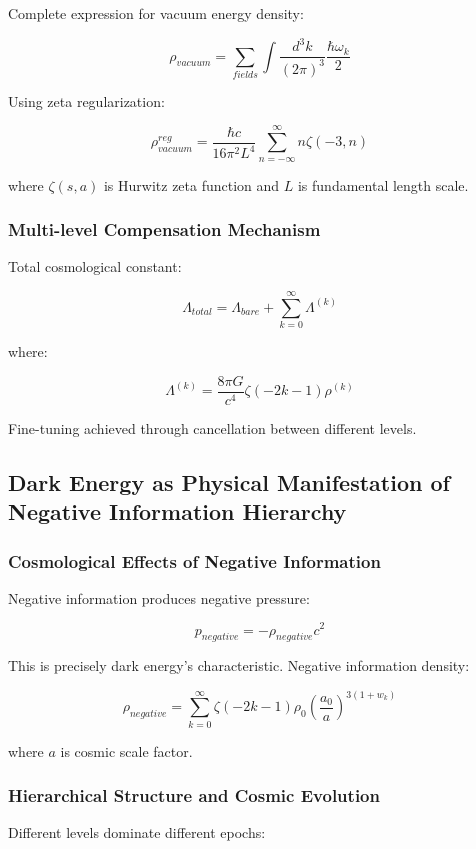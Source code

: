 \documentclass[12pt,a4paper]{article}
\begin{document}
Complete expression for vacuum energy density:

$$\rho_{vacuum} = \sum_{fields} \int \frac{d^3k}{(2\pi)^3} \frac{\hbar\omega_k}{2}$$

Using zeta regularization:

$$\rho_{vacuum}^{reg} = \frac{\hbar c}{16\pi^2 L^4} \sum_{n=-\infty}^{\infty} n \zeta(-3,n)$$

where $\zeta(s,a)$ is Hurwitz zeta function and $L$ is fundamental length scale.

\subsubsection{Multi-level Compensation Mechanism}

Total cosmological constant:

$$\Lambda_{total} = \Lambda_{bare} + \sum_{k=0}^{\infty} \Lambda^{(k)}$$

where:

$$\Lambda^{(k)} = \frac{8\pi G}{c^4} \zeta(-2k-1) \rho^{(k)}$$

Fine-tuning achieved through cancellation between different levels.

\subsection{Dark Energy as Physical Manifestation of Negative Information Hierarchy}

\subsubsection{Cosmological Effects of Negative Information}

Negative information produces negative pressure:

$$p_{negative} = -\rho_{negative} c^2$$

This is precisely dark energy's characteristic. Negative information density:

$$\rho_{negative} = \sum_{k=0}^{\infty} \zeta(-2k-1) \rho_0 \left(\frac{a_0}{a}\right)^{3(1+w_k)}$$

where $a$ is cosmic scale factor.

\subsubsection{Hierarchical Structure and Cosmic Evolution}

Different levels dominate different epochs:
\end{document}
